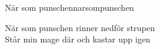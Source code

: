 \begin{song}{När som punschen}{narsompunschen}
\begin{vers}
När som punschen rinner nedför strupen\\
Står min mage där och kastar upp igen\\
\end{vers}
\end{song}
